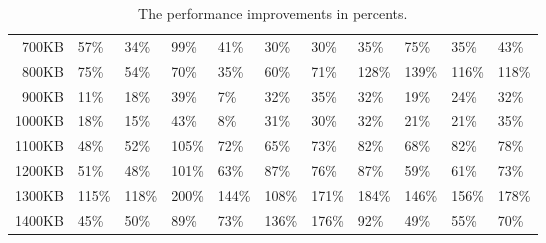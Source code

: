 \begin {table}[htpb]
\begin{tabular}{r|l|l|l|l|l|l|l|l|l|l}
700KB&57\%&34\%&99\%&41\%&30\%&30\%&35\%&75\%&35\%&43\%\\
800KB&75\%&54\%&70\%&35\%&60\%&71\%&128\%&139\%&116\%&118\%\\
900KB&11\%&18\%&39\%&7\%&32\%&35\%&32\%&19\%&24\%&32\%\\
1000KB&18\%&15\%&43\%&8\%&31\%&30\%&32\%&21\%&21\%&35\%\\
1100KB&48\%&52\%&105\%&72\%&65\%&73\%&82\%&68\%&82\%&78\%\\
1200KB&51\%&48\%&101\%&63\%&87\%&76\%&87\%&59\%&61\%&73\%\\
1300KB&115\%&118\%&200\%&144\%&108\%&171\%&184\%&146\%&156\%&178\%\\
1400KB&45\%&50\%&89\%&73\%&136\%&176\%&92\%&49\%&55\%&70\%\\
\end{tabular}
\caption{The performance improvements in percents.}
\label{tab:improvements-percent}
\end {table}
